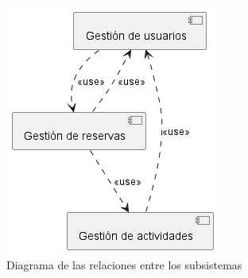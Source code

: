 \begin{figure}[H]
	\centering
	\includegraphics[width=0.5\linewidth]{5-AnalisisDelSistemaDeInformacion/diagrama.png}
	\caption{Diagrama de las relaciones entre los subsistemas}
	\label{fig:diagrama}
\end{figure}
